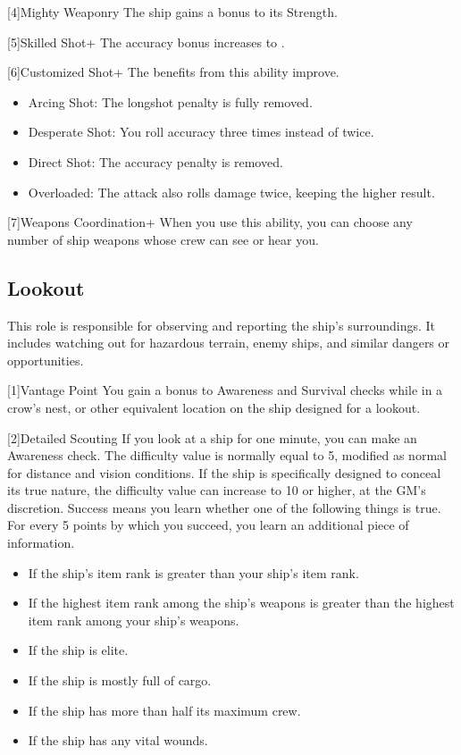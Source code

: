     [4]{Mighty Weaponry} The ship gains a  bonus to its Strength.

    [5]{Skilled Shot+} The accuracy bonus increases to .

    [6]{Customized Shot+} The benefits from this ability improve.
      \begin{itemize}
        \item Arcing Shot: The longshot penalty is fully removed.
        \item Desperate Shot: You roll accuracy three times instead of twice.
        \item Direct Shot: The accuracy penalty is removed.
        \item Overloaded: The attack also rolls damage twice, keeping the higher result.
      \end{itemize}

    [7]{Weapons Coordination+} When you use this ability, you can choose any number of ship weapons whose crew can see or hear you.

  \subsection{Lookout}
    This role is responsible for observing and reporting the ship's surroundings.
    It includes watching out for hazardous terrain, enemy ships, and similar dangers or opportunities.

    [1]{Vantage Point} You gain a  bonus to Awareness and Survival checks while in a crow's nest, or other equivalent location on the ship designed for a lookout.

    [2]{Detailed Scouting} If you look at a ship for one minute, you can make an Awareness check.
      The difficulty value is normally equal to 5, modified as normal for distance and vision conditions.
      If the ship is specifically designed to conceal its true nature, the difficulty value can increase to 10 or higher, at the GM's discretion.
      Success means you learn whether one of the following things is true.
      For every 5 points by which you succeed, you learn an additional piece of information.
      \begin{itemize}
        \item If the ship's item rank is greater than your ship's item rank.
        \item If the highest item rank among the ship's weapons is greater than the highest item rank among your ship's weapons.
        \item If the ship is elite.
        \item If the ship is mostly full of cargo.
        \item If the ship has more than half its maximum crew.
        \item If the ship has any vital wounds.
      \end{itemize}

